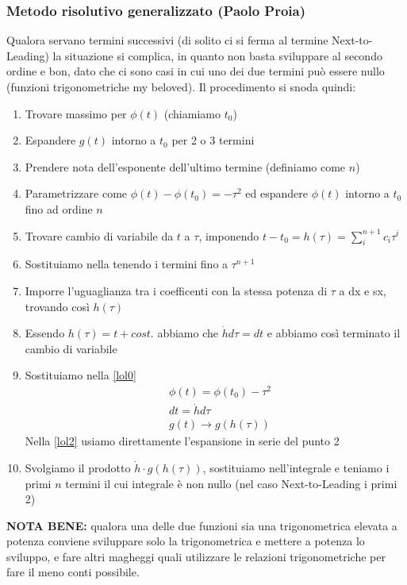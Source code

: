 \subsubsection{Metodo risolutivo generalizzato (Paolo Proia)}

Qualora servano termini successivi (di solito ci si ferma al termine Next-to-Leading) la situazione si complica, in quanto non basta sviluppare al secondo ordine e bon, dato che ci sono casi in cui uno dei due termini può essere nullo (funzioni trigonometriche my beloved). Il procedimento si snoda quindi:
\begin{enumerate}
	\item Trovare massimo per \(\phi(t)\) (chiamiamo \(t_0\))
	\item Espandere \(g(t)\) intorno a \(t_0\) per 2 o 3 termini
	\item Prendere nota dell'esponente dell'ultimo termine (definiamo come  \(n\)) 
	\item Parametrizzare come $\phi(t) - \phi(t_0)=-\tau^2 \label{lol1}$
	ed espandere \(\phi(t)\) intorno a $t_0$ fino ad ordine \(n\)
	\item Trovare cambio di variabile da \(t\) a \(\tau\), imponendo $t - t_0 = h(\tau) = \sum_i^{n+1} c_i \tau^i$
	\item Sostituiamo nella  tenendo i termini fino a \(\tau^{n+1}\)
	\item Imporre l'uguaglianza tra i coefficenti con la stessa potenza di \(\tau\) a dx e sx, trovando così \(h(\tau)\)
	\item Essendo \(h(\tau) = t + cost. \) abbiamo che \(\dot{h}d\tau = dt\) e abbiamo così terminato il cambio di variabile
	\item Sostituiamo nella \ref{lol0}
	\begin{align}
		&\phi(t) = \phi(t_0) - \tau^2\\
		&dt=\dot{h}d\tau\\
		&g(t) \to g(h(\tau)) \label{lol2}
	\end{align}
	Nella \ref{lol2} usiamo direttamente l'espansione in serie del punto 2
	\item Svolgiamo il prodotto \(\dot{h} \cdot g(h(\tau))\), sostituiamo nell'integrale e teniamo i primi $n$ termini il cui integrale è non nullo (nel caso Next-to-Leading i primi 2)
\end{enumerate}

\textbf{NOTA BENE:} qualora una delle due funzioni sia una trigonometrica elevata a potenza conviene sviluppare solo la trigonometrica e mettere a potenza lo sviluppo, e fare altri magheggi
quali utilizzare le relazioni trigonometriche per fare il meno conti possibile.

